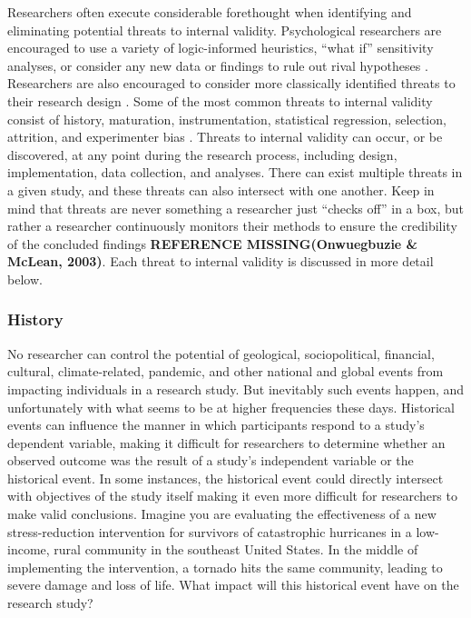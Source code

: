 \documentclass[
  11pt,
]{book}
\begin{document}
Researchers often execute considerable forethought when identifying and eliminating potential threats to internal validity. Psychological researchers are encouraged to use a variety of logic-informed heuristics, ``what if'' sensitivity analyses, or consider any new data or findings to rule out rival hypotheses \citep{kenny_enhancing_2019}. Researchers are also encouraged to consider more classically identified threats to their research design \citep{campbell_experimental_1963}. Some of the most common threats to internal validity consist of history, maturation, instrumentation, statistical regression, selection, attrition, and experimenter bias \citep{campbell_experimental_1963, cook_quasi-experimentation_1979, shadish_experimental_2002}. Threats to internal validity can occur, or be discovered, at any point during the research process, including design, implementation, data collection, and analyses. There can exist multiple threats in a given study, and these threats can also intersect with one another. Keep in mind that threats are never something a researcher just ``checks off'' in a box, but rather a researcher continuously monitors their methods to ensure the credibility of the concluded findings \textbf{REFERENCE MISSING(Onwuegbuzie \& McLean, 2003)}. Each threat to internal validity is discussed in more detail below.

\subsubsection{History}\label{history}

No researcher can control the potential of geological, sociopolitical, financial, cultural, climate-related, pandemic, and other national and global events from impacting individuals in a research study. But inevitably such events happen, and unfortunately with what seems to be at higher frequencies these days. Historical events can influence the manner in which participants respond to a study's dependent variable, making it difficult for researchers to determine whether an observed outcome was the result of a study's independent variable or the historical event. In some instances, the historical event could directly intersect with objectives of the study itself making it even more difficult for researchers to make valid conclusions. Imagine you are evaluating the effectiveness of a new stress-reduction intervention for survivors of catastrophic hurricanes in a low-income, rural community in the southeast United States. In the middle of implementing the intervention, a tornado hits the same community, leading to severe damage and loss of life. What impact will this historical event have on the research study?
\end{document}
